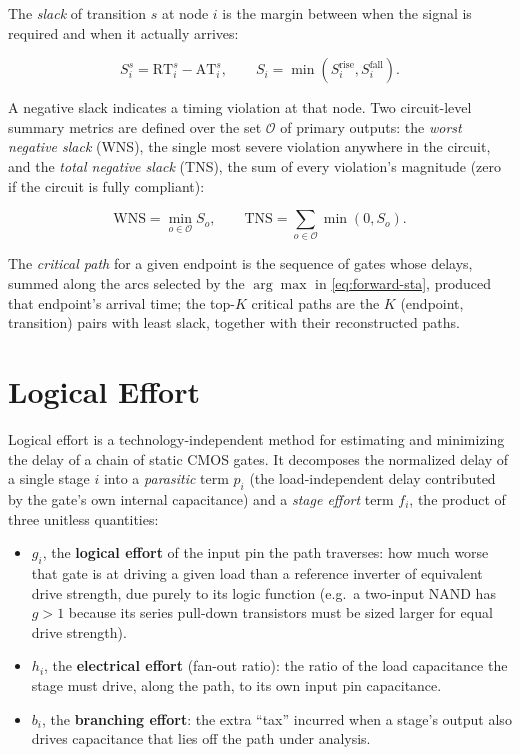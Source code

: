 The \emph{slack} of transition $s$ at node $i$ is the margin between when
the signal is required and when it actually arrives:

\begin{equation}
    S_i^{s} = \mathrm{RT}_i^{s} - \mathrm{AT}_i^{s}, \qquad S_i = \min\!\left(S_i^{\mathrm{rise}}, S_i^{\mathrm{fall}}\right).
    \label{eq:slack}
\end{equation}

A negative slack indicates a timing violation at that node. Two
circuit-level summary metrics are defined over the set $\mathcal{O}$ of
primary outputs: the \emph{worst negative slack} (WNS), the single most
severe violation anywhere in the circuit, and the \emph{total negative
slack} (TNS), the sum of every violation's magnitude (zero if the circuit is
fully compliant):

\begin{equation}
    \mathrm{WNS} = \min_{o \in \mathcal{O}} S_o, \qquad
    \mathrm{TNS} = \sum_{o \in \mathcal{O}} \min(0, S_o).
    \label{eq:wns-tns}
\end{equation}

The \emph{critical path} for a given endpoint is the sequence of gates whose
delays, summed along the arcs selected by the $\arg\max$ in
\cref{eq:forward-sta}, produced that endpoint's arrival time; the top-$K$
critical paths are the $K$ (endpoint, transition) pairs with least slack,
together with their reconstructed paths.

\section{Logical Effort}
\label{sec:bg-le}

Logical effort is a technology-independent method for estimating and
minimizing the delay of a chain of static CMOS gates.
It decomposes the normalized delay of a single stage $i$ into a
\emph{parasitic} term $p_i$ (the load-independent delay contributed by the
gate's own internal capacitance) and a \emph{stage effort} term $f_i$, the
product of three unitless quantities:

\begin{itemize}
    \item $g_i$, the \textbf{logical effort} of the input pin the path
          traverses: how much worse that gate is at driving a given load
          than a reference inverter of equivalent drive strength, due
          purely to its logic function (e.g.\ a two-input NAND has $g > 1$
          because its series pull-down transistors must be sized larger for
          equal drive strength).
    \item $h_i$, the \textbf{electrical effort} (fan-out ratio): the ratio
          of the load capacitance the stage must drive, along the path, to
          its own input pin capacitance.
    \item $b_i$, the \textbf{branching effort}: the extra ``tax'' incurred
          when a stage's output also drives capacitance that lies off the
          path under analysis.
\end{itemize}

